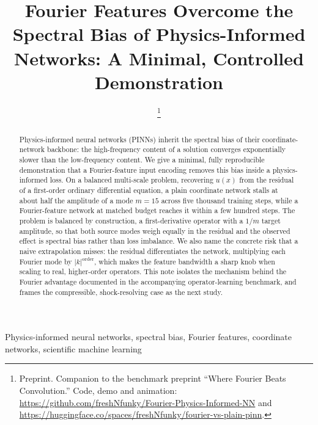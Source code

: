 \documentclass[conference]{IEEEtran}
\begin{document}
\title{Fourier Features Overcome the Spectral Bias of Physics-Informed Networks: A Minimal, Controlled Demonstration}

\author{
\thanks{Preprint. Companion to the benchmark preprint ``Where Fourier Beats Convolution.'' Code, demo and animation: \url{https://github.com/freshNfunky/Fourier-Physics-Informed-NN} and \url{https://huggingface.co/spaces/freshNfunky/fourier-vs-plain-pinn}.}}

\maketitle

\begin{abstract}
Physics-informed neural networks (PINNs) inherit the spectral bias of their coordinate-network backbone: the high-frequency content of a solution converges exponentially slower than the low-frequency content. We give a minimal, fully reproducible demonstration that a Fourier-feature input encoding removes this bias inside a physics-informed loss. On a balanced multi-scale problem, recovering $u(x)$ from the residual of a first-order ordinary differential equation, a plain coordinate network stalls at about half the amplitude of a mode $m=15$ across five thousand training steps, while a Fourier-feature network at matched budget reaches it within a few hundred steps. The problem is balanced by construction, a first-derivative operator with a $1/m$ target amplitude, so that both source modes weigh equally in the residual and the observed effect is spectral bias rather than loss imbalance. We also name the concrete risk that a naive extrapolation misses: the residual differentiates the network, multiplying each Fourier mode by $|k|^{\mathrm{order}}$, which makes the feature bandwidth a sharp knob when scaling to real, higher-order operators. This note isolates the mechanism behind the Fourier advantage documented in the accompanying operator-learning benchmark, and frames the compressible, shock-resolving case as the next study.
\end{abstract}

\begin{IEEEkeywords}
Physics-informed neural networks, spectral bias, Fourier features, coordinate networks, scientific machine learning
\end{IEEEkeywords}
\end{document}
